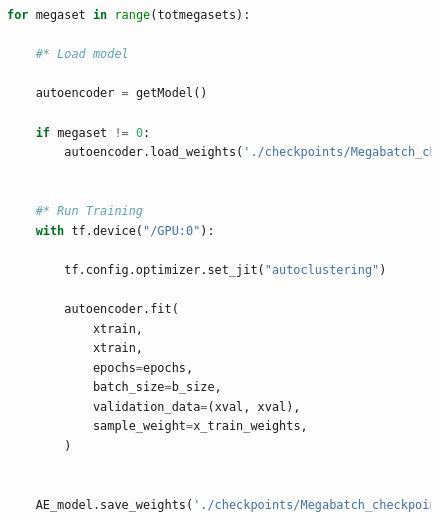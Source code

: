 \begin{figure}[H]
    \centering
\begin{lstlisting}[language=Python, style=pythonstyle, label={code:megabatch_training}]
for megaset in range(totmegasets):
    
    #* Load model 

    autoencoder = getModel()
    
    if megaset != 0:
        autoencoder.load_weights('./checkpoints/Megabatch_checkpoint')
        
        
    #* Run Training
    with tf.device("/GPU:0"):

        tf.config.optimizer.set_jit("autoclustering")

        autoencoder.fit(
            xtrain,
            xtrain,
            epochs=epochs,
            batch_size=b_size,
            validation_data=(xval, xval),
            sample_weight=x_train_weights,
        )
        
    
    AE_model.save_weights('./checkpoints/Megabatch_checkpoint')

\end{lstlisting}
\end{figure}

